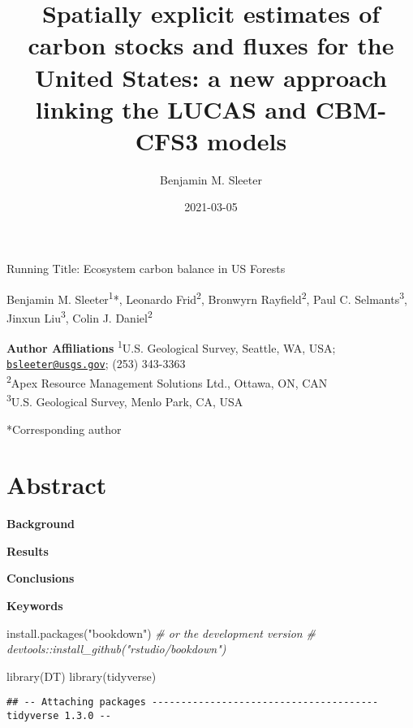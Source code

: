 \documentclass[
]{book}
\title{Spatially explicit estimates of carbon stocks and fluxes for the United States: a new approach linking the LUCAS and CBM-CFS3 models}
\author{Benjamin M. Sleeter}
\date{2021-03-05}
\newenvironment{Shaded}{\begin{snugshade}}{\end{snugshade}}
\newcommand{\CommentTok}[1]{\textcolor[rgb]{0.56,0.35,0.01}{\textit{#1}}}
\newcommand{\FunctionTok}[1]{\textcolor[rgb]{0.00,0.00,0.00}{#1}}
\newcommand{\NormalTok}[1]{#1}
\newcommand{\StringTok}[1]{\textcolor[rgb]{0.31,0.60,0.02}{#1}}
\begin{document}
\maketitle

{
\setcounter{tocdepth}{1}
\tableofcontents
}
Running Title: Ecosystem carbon balance in US Forests

Benjamin M. Sleeter\textsuperscript{1}*, Leonardo Frid\textsuperscript{2}, Bronwyrn Rayfield\textsuperscript{2}, Paul C. Selmants\textsuperscript{3}, Jinxun Liu\textsuperscript{3}, Colin J. Daniel\textsuperscript{2}

\textbf{Author Affiliations}
\textsuperscript{1}U.S. Geological Survey, Seattle, WA, USA; \href{mailto:bsleeter@usgs.gov}{\nolinkurl{bsleeter@usgs.gov}}; (253) 343-3363\\
\textsuperscript{2}Apex Resource Management Solutions Ltd., Ottawa, ON, CAN\\
\textsuperscript{3}U.S. Geological Survey, Menlo Park, CA, USA

*Corresponding author

\hypertarget{abstract}{%
\chapter{Abstract}\label{abstract}}

\textbf{Background}

\textbf{Results}

\textbf{Conclusions}

\textbf{Keywords}

\begin{Shaded}
\begin{Highlighting}[]
\FunctionTok{install.packages}\NormalTok{(}\StringTok{"bookdown"}\NormalTok{)}
\CommentTok{\# or the development version}
\CommentTok{\# devtools::install\_github("rstudio/bookdown")}
\end{Highlighting}
\end{Shaded}

\begin{Shaded}
\begin{Highlighting}[]
\FunctionTok{library}\NormalTok{(DT)}
\FunctionTok{library}\NormalTok{(tidyverse)}
\end{Highlighting}
\end{Shaded}

\begin{verbatim}
## -- Attaching packages --------------------------------------- tidyverse 1.3.0 --
\end{verbatim}
\end{document}
